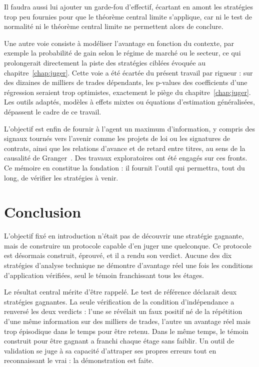 Il faudra aussi lui ajouter un garde-fou d'effectif, écartant en amont les
stratégies trop peu fournies pour que le théorème central limite s'applique,
car ni le test de normalité ni le théorème central limite ne permettent alors
de conclure.

Une autre voie consiste à modéliser l'avantage en fonction du contexte, par
exemple la probabilité de gain selon le régime de marché ou le secteur, ce qui
prolongerait directement la piste des stratégies ciblées évoquée au
chapitre~\ref{chap:juger}. Cette voie a été écartée du présent travail par
rigueur : sur des dizaines de milliers de trades dépendants, les p-values des
coefficients d'une régression seraient trop optimistes, exactement le piège du
chapitre~\ref{chap:juger}. Les outils adaptés, modèles à effets mixtes ou
équations d'estimation généralisées, dépassent le cadre de ce travail.

L'objectif est enfin de fournir à l'agent un maximum d'information, y compris
des signaux tournés vers l'avenir comme les projets de loi ou les signatures de
contrats, ainsi que les relations d'avance et de retard entre titres, au sens
de la causalité de Granger~\cite{granger1969}. Des travaux exploratoires ont
été engagés sur ces fronts. Ce mémoire en constitue la fondation : il fournit
l'outil qui permettra, tout du long, de vérifier les stratégies à venir.
\chapter*{Conclusion}
\label{chap:conclusion}

L'objectif fixé en introduction n'était pas de découvrir une stratégie
gagnante, mais de construire un protocole capable d'en juger une quelconque.
Ce protocole est désormais construit, éprouvé, et il a rendu son verdict.
Aucune des dix stratégies d'analyse technique ne démontre d'avantage réel une
fois les conditions d'application vérifiées, seul le témoin franchissant tous
les étages.

Le résultat central mérite d'être rappelé. Le test de référence déclarait deux
stratégies gagnantes. La seule vérification de la condition d'indépendance a
renversé les deux verdicts : l'une se révélait un faux positif né de la
répétition d'une même information sur des milliers de trades, l'autre un
avantage réel mais trop épisodique dans le temps pour être retenu. Dans le
même temps, le témoin construit pour être gagnant a franchi chaque étage sans
faiblir. Un outil de validation se juge à sa capacité d'attraper ses propres
erreurs tout en reconnaissant le vrai : la démonstration est faite.

